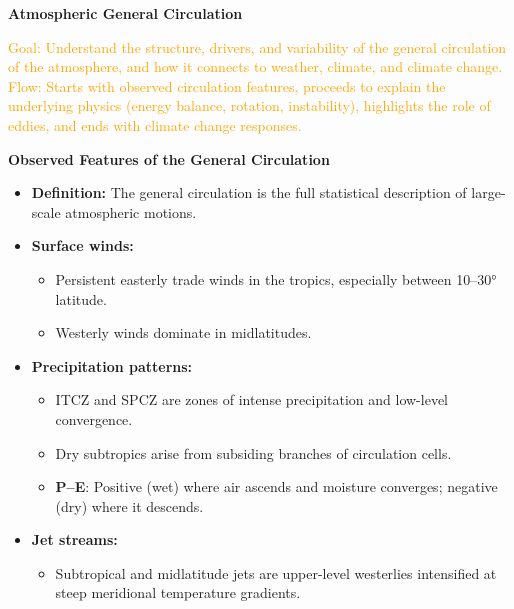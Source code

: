 \documentclass[fontsize=8pt, a4paper, landscape, fleqn]{scrartcl}
\renewcommand{\section}[1]{%
    \noindent\colorbox{sectioncolor}{%
        \parbox{\dimexpr\columnwidth-2\fboxsep}{\color{white}\textbf{#1}}}%
    \vspace{0.5mm}%
}
\renewcommand{\subsection}[1]{%
    \noindent\colorbox{subsectioncolor}{%
        \parbox{\dimexpr\columnwidth-2\fboxsep}{\color{white}\textbf{#1}}}%
    \vspace{0.5mm}%
}
\begin{document}
\begin{multicols*}{3}[\raggedcolumns]


\section{Atmospheric General Circulation}
\noindent\textcolor{orange}{
Goal: Understand the structure, drivers, and variability of the general circulation of the atmosphere, and how it connects to weather, climate, and climate change.\\
Flow: Starts with observed circulation features, proceeds to explain the underlying physics (energy balance, rotation, instability), highlights the role of eddies, and ends with climate change responses.
}

\subsection{Observed Features of the General Circulation}
\begin{itemize}
    \item \textbf{Definition:} The general circulation is the full statistical description of large-scale atmospheric motions.
    \item \textbf{Surface winds:} 
    \begin{itemize}
        \item Persistent easterly trade winds in the tropics, especially between 10–30° latitude.
        \item Westerly winds dominate in midlatitudes.
    \end{itemize}
    \item \textbf{Precipitation patterns:}
    \begin{itemize}
        \item ITCZ and SPCZ are zones of intense precipitation and low-level convergence.
        \item Dry subtropics arise from subsiding branches of circulation cells.
        \item \textbf{P–E}: Positive (wet) where air ascends and moisture converges; negative (dry) where it descends.
    \end{itemize}
    \item \textbf{Jet streams:} 
    \begin{itemize}
        \item Subtropical and midlatitude jets are upper-level westerlies intensified at steep meridional temperature gradients.
    \end{itemize}

\end{itemize}
\end{multicols*}
\end{document}
